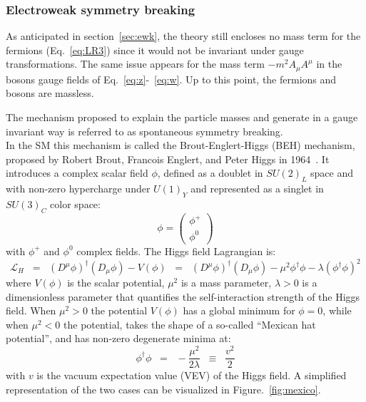 \subsubsection{Electroweak symmetry breaking}\label{sec:symBreaking}
As anticipated in section~\ref{sec:ewk}, the theory still encloses no mass term for the fermions (Eq.~\ref{eq:LR3}) since it would not be invariant under gauge transformations. The same issue appears for the mass term $-m^2A_{\mu}A^{\mu}$ in the bosons gauge fields of Eq.~\ref{eq:z}-~\ref{eq:w}. Up to this point, the fermions and bosons are massless.

The mechanism proposed to explain the particle masses and generate in a gauge invariant way is referred to as spontaneous symmetry breaking.\\
In the SM this mechanism is called the Brout-Englert-Higgs (BEH) mechanism, proposed by Robert Brout, Francois Englert, and Peter Higgs in 1964~\cite{PhysRevLett.13.321,PhysRevLett.13.508}. It introduces a complex scalar field $\phi$, defined as a doublet in $SU(2)_{L}$ space and with non-zero hypercharge under $U(1)_Y$ and represented as a singlet in $SU(3)_{C}$ color space:
\begin{equation}
\label{eq:higgsphi}
\phi = \begin{pmatrix}
\phi^+\\
\phi^0
\end{pmatrix}
\end{equation}
with $\phi^+$ and $\phi^0$ complex fields. The Higgs field Lagrangian is:
\begin{equation}
\label{eq:higgsL}
 \mathcal{L}_{H} \;\; = \;\; (D^{\mu}\phi)^\dag (D_{\mu}\phi) - V(\phi) \;\; = \;\; (D^{\mu}\phi)^\dag (D_{\mu}\phi) - \mu^2\phi^\dag \phi - \lambda(\phi^\dag \phi)^2
\end{equation}
where $V(\phi)$ is the scalar potential, $\mu^2$ is a mass parameter, $\lambda > 0$ is a dimensionless parameter that quantifies the self-interaction strength of the Higgs field. When $\mu^2 > 0$ the potential $V(\phi)$ has a global minimum for $\phi = 0$, while when $\mu^2 < 0$ the potential, takes the shape of a so-called ``Mexican hat potential'', and has non-zero degenerate minima at:
\begin{equation}
\label{eq:higgsM}
\phi^\dag \phi \;\; = \;\; - \frac{\mu^2}{2\lambda} \;\; \equiv \;\; \frac{v^2}{2}
\end{equation}
with $v$ is the vacuum expectation value (VEV) of the Higgs field. A simplified representation of the two cases can be visualized in Figure.~\ref{fig:mexico}.

